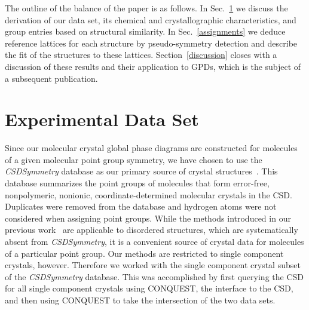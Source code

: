 \documentclass[preprint]{revtex4}              %
\begin{document}
The outline of the balance of the paper is as follows. In
Sec.~\ref{Reference_Phases} we discuss the derivation of our data
set, its chemical and crystallographic characteristics, and group
entries based on structural similarity. In Sec.~\ref{assignments} we
deduce reference lattices for each structure by pseudo-symmetry
detection and describe the fit of the structures to these lattices.
Section~\ref{discussion} closes with a discussion of these results
and their application to GPDs, which is the subject of a subsequent
publication.~\cite{Keith06b}

\section{Experimental Data Set}
\label{Reference_Phases}

Since our molecular crystal global phase diagrams are constructed
for molecules of a given molecular point group symmetry, we have
chosen to use the \emph{CSDSymmetry} database as our primary source
of crystal structures~\cite{Yao02}. This database summarizes the
point groups of molecules that form error-free, nonpolymeric,
nonionic, coordinate-determined molecular crystals in the CSD.
Duplicates were removed from the database and hydrogen atoms were
not considered when assigning point groups. While the methods
introduced in our previous work~\cite{Mettes04} are applicable to
disordered structures, which are systematically absent from
\emph{CSDSymmetry}, it is a convenient source of crystal data for
molecules of a particular point group. Our methods are restricted to
single component crystals, however. Therefore we worked with the
single component crystal subset of the \emph{CSDSymmetry} database.
This was accomplished by first querying the CSD for all single
component crystals using {C\small ONQUEST}, the interface to the
CSD, and then using {C\small ONQUEST} to take the intersection of
the two data sets.
\end{document}

